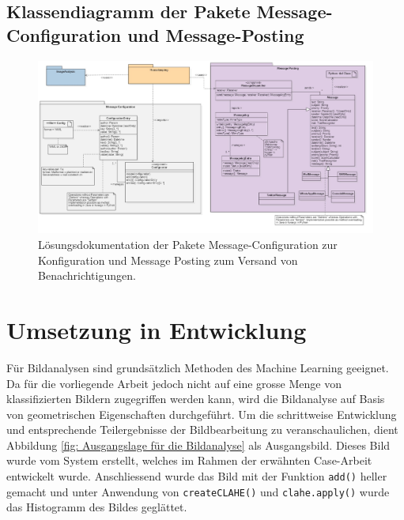 \begin{landscape}
\subsection{Klassendiagramm der Pakete Message-Configuration und Message-Posting}
\begin{figure}[H]
	\center
	\includegraphics[scale=0.43]{Grafiken/modelle/solution-messaging.jpg}
	\caption{Lösungsdokumentation der Pakete Message-Configuration zur Konfiguration und Message Posting zum Versand von Benachrichtigungen.} 
	\label{fig: Lösungsdokumentation der Pakete Message-Configuration zur Konfiguration und Message Posting zum Versand von Benachrichtigungen.}
\end{figure}


\end{landscape}
\restoregeometry %


\section{Umsetzung in Entwicklung}
Für Bildanalysen sind grundsätzlich Methoden des Machine Learning geeignet. Da für die vorliegende Arbeit jedoch nicht auf eine grosse Menge von klassifizierten Bildern zugegriffen werden kann, wird die Bildanalyse auf Basis von geometrischen Eigenschaften durchgeführt.
Um die schrittweise Entwicklung und entsprechende Teilergebnisse der Bildbearbeitung zu veranschaulichen, dient Abbildung \ref{fig: Ausgangslage für die Bildanalyse} als Ausgangsbild. Dieses Bild wurde vom System erstellt, welches im Rahmen der erwähnten Case-Arbeit entwickelt wurde. Anschliessend wurde das Bild mit der Funktion \texttt{add()} heller gemacht und unter Anwendung von \texttt{createCLAHE()} und \texttt{clahe.apply()} wurde das Histogramm des Bildes geglättet. 

